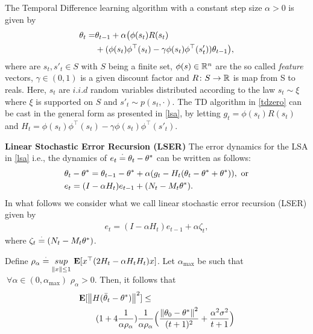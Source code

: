 \begin{example}
The Temporal Difference learning algorithm with a constant step size $\alpha>0$ is given by
\begin{align}\label{tdzero}
\theta_t=&\theta_{t-1}+\alpha \big(\phi(s_t) R(s_t)\nn\\&+ (\phi(s_t)\phi^\top(s_t)-\gamma \phi(s_t)\phi^\top(s'_t))\theta_{t-1}\big),
\end{align}
where are $s_t,s'_t\in S$ with $S$ being a finite set, $\phi(s)\in \R^n$ are the so called \emph{feature} vectors, $\gamma\in (0,1)$ is a given discount factor and $R\colon S\ra \R$ is map from S to reals. Here, $s_t$ are $i.i.d$ random variables distributed according to the law $s_t\sim \xi$ where $\xi$ is supported on $S$ and $s'_t\sim p(s_t,\cdot)$. The TD algorithm in \eqref{tdzero} can be cast in the general form as presented in \eqref{lsa}, by letting $g_t=\phi(s_t)R(s_t)$ and $H_t=\phi(s_t)\phi^\top(s_t)-\gamma \phi(s_t)\phi^\top(s'_t)$.
\end{example}

\textbf{Linear Stochastic Error Recursion (LSER)} The error dynamics for the LSA in \eqref{lsa} i.e., the dynamics of $e_t\eqdef\theta_t-\ts$ can be written as follows:
\begin{align}\label{errprelim}
&\theta_t-\ts=\theta_{t-1}-\ts+\alpha(g_t -H_t(\theta_t-\ts+\ts)),\text{~or}\nn\\
&e_t=(I-\alpha H_t)e_{t-1}+(N_t-M_t\ts).
\end{align}
In what follows we consider what we call linear stochastic error recursion (LSER) given by
\begin{align}\label{lsergen}
e_t=(I-\alpha H_t)e_{t-1}+\alpha \zeta_t,
\end{align}
where $\zeta_t\eqdef (N_t-M_t\ts)$.
\begin{theorem}\label{maintheorem}
Define $\rho_\alpha\eqdef \us{sup}{\norm{x}\leq 1}\E[x^\top (2H_t-\alpha H_tH_t)x]$. Let $\alpha_{\max}$ be such that $~\forall \alpha\in(0,\alpha_{\max})$ $\rho_{\alpha}>0$. Then, it follows that
\begin{align}
\begin{split}
\MoveEqLeft\E[\norm{H(\tb_t-\ts)}^2]\leq \\
&(1+4\frac1{\alpha\rho_{\alpha}}) \frac{1}{\alpha\rho_{\alpha}} \Big(\frac{\norm{\theta_0-\ts}^2}{(t+1)^2}+\frac{\alpha^2\sigma^2}{t+1} \Big)
\end{split}
\end{align}
\end{theorem}
